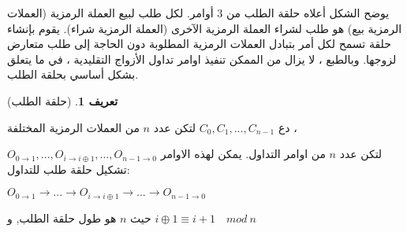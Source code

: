 \documentclass[12pt, a4paper, leqno]{report}
\makeatletter
\newenvironment{figurehere}
 {\def\@captype{figure}}
 {}
\theoremstyle{plain}
\theoremstyle{definition}
\newtheorem{defn}[thm]{تعريف}
\makeatother
\begin{document}
\begin{multicols}{2}
\begin{otherlanguage}{arabic}
\begin{center}
\begin{figurehere}

\caption{حلقة الطلب  ل3  أوامر}
\label{fig:ring}
\end{figurehere}
\end{center}

يوضح الشكل أعلاه حلقة الطلب من 3 أوامر. لكل طلب لبيع العملة الرمزية (العملات الرمزية بيع) هو طلب لشراء العملة الرمزية  الآخرى  (العملة الرمزية شراء). يقوم بإنشاء حلقة تسمح لكل أمر بتبادل العملات الرمزية المطلوبة دون الحاجة إلى طلب متعارض لزوجها. وبالطبع ، لا يزال من الممكن تنفيذ اوامر تداول الأزواج التقليدية ، في ما يتعلق بشكل أساسي بحلقة الطلب.

\begin{defn}{(حلقة الطلب)}

دع $C_0, C_1, ..., C_{n-1}$
لتكن عدد $n$ من العملات الرمزية المختلفة ،

$O_{0 \to 1}, ..., O_{i \to i \oplus 1}, ..., O_{n-1 \to 0}$ لتكن عدد $n$ من اوامر التداول. يمكن لهذه الاوامر تشكيل حلقة طلب للتداول:

$O_{0 \to 1} \to ... \to O_{i \to i \oplus 1} \to ... \to O_{n-1 \to 0}$

حيث $n$ هو طول حلقة الطلب, و
$i \oplus 1 \equiv i + 1\quad mod\ n$
\end{defn}


\end{otherlanguage}
\end{multicols}
\end{document}
